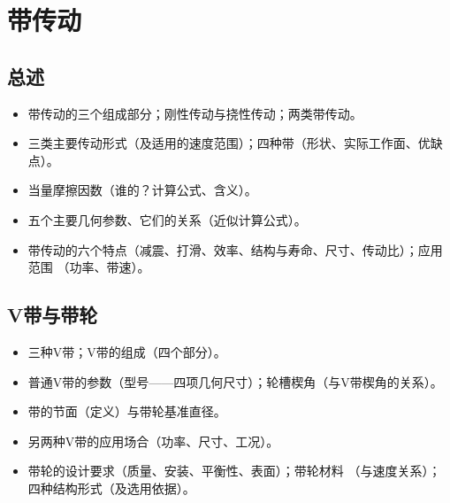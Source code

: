 \documentclass[12pt,a4paper]{article}
\newcommand{\tightlist}{\setlength{\parskip}{0pt}\setlength{\itemsep}{0pt}}
\newcommand{\hint}[1]{\textsf{（#1）}}
\newcommand{\minor}[1]{{\color{gray} #1}}
\begin{document}
\section{带传动}
\subsection{总述}
\begin{itemize}\tightlist
    \item 带传动的三个组成部分；刚性传动与挠性传动；两类带传动。
    \item 三类主要传动形式\hint{及适用的速度范围}；四种带\hint{形状、实际工作面、优缺点}。
    \item 当量摩擦因数\hint{谁的？计算公式、含义}。
    \item 五个主要几何参数、它们的关系\hint{近似计算公式}。
    \item 带传动的六个特点\hint{减震、打滑、效率、结构与寿命、尺寸、传动比}；应用范围
    \hint{功率、带速}。
\end{itemize}

\subsection{V带与带轮}
\begin{itemize}\tightlist
    \item 三种V带；V带的组成\hint{四个部分}。
    \item 普通V带的参数\hint{型号——四项几何尺寸}；轮槽楔角\hint{与V带楔角的关系}。
    \item 带的节面\hint{定义}与带轮基准直径。
    \item \minor{另两种V带的应用场合\hint{功率、尺寸、工况}。}
    \item \minor{带轮的设计要求\hint{质量、安装、平衡性、表面}；}带轮材料
    \hint{与速度关系}；\minor{四种结构形式\hint{及选用依据}。}
\end{itemize}
\end{document}
